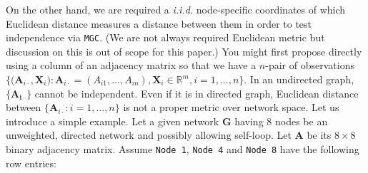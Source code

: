 \documentclass[12pt]{article}
\theoremstyle{definition}
\begin{document}
On the other hand, we are required a \textit{i.i.d.} node-specific coordinates of which Euclidean distance measures a distance between them in order to test independence via \texttt{MGC}. (We are not always required Euclidean metric \citep{lyons2013distance} but discussion on this is out of scope for this paper.) You might first propose directly using a column of an adjacency matrix so that we have a $n$-pair of observations $\big\{ \big( \boldsymbol{A}_{i \cdot} , \boldsymbol{X}_{i} \big) : \boldsymbol{A}_{i \cdot} = (A_{i 1} , ... , A_{i n} ), \boldsymbol{X}_{i} \in \mathbb{R}^{m}, i=1,...,n  \big\}.$ In an undirected graph, $\{ \mathbf{A_{i \cdot}}  \}$ cannot be independent. Even if it is in directed graph, Euclidean distance between $\{ \boldsymbol{A}_{i \cdot} : i =1, ... , n \}$ is not a proper metric over network space. Let us introduce a simple example. Let a given network $\boldsymbol{G}$ having 8 nodes be an unweighted, directed network and possibly allowing self-loop. Let $\boldsymbol{A}$ be its $8 \times 8$ binary adjacency matrix. Assume \texttt{Node 1}, \texttt{Node 4} and \texttt{Node 8} have the following row entries:
	
\end{document}
